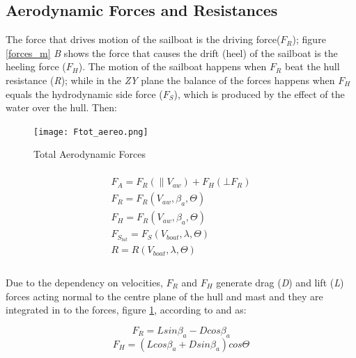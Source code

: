 \subsection{Aerodynamic Forces and Resistances} \label{sec:aero_forces}
The force that drives motion of the sailboat is the driving force($F_{R}$); figure \ref{forces_m} \textit{B}  shows the force that causes the drift (heel) of the sailboat is the heeling force ($F_{H}$). The motion of the sailboat happens when $F_{R}$ beat the hull resistance (\textit{R}); while in the \textit{ZY} plane the balance of the forces happens when $F_{H}$ equals the hydrodynamic side force ($F_{S}$), which is produced by the effect of the water over the hull. Then:\par 
\begin{figure}
    \centering
    \texttt{[image: Ftot\_aereo.png]}
    \caption{Total Aerodynamic Forces \cite{fossati2009aero}}
    \label{fig:Ftot_aereo}
\end{figure}
\begin{multline}
\\
F_{A}=F_{R}(\parallel V_{aw}) + F_{H}(\bot F_{R} )\\
F_{R}=F_{R}(V_{aw},\beta_{a}, \Theta) \\
F_{H}=F_{R}(V_{aw},\beta_{a}, \Theta) \\
F_{S_{lat}}=F_{S}(V_{boat},\lambda, \Theta) \\
R=R(V_{boat},\lambda, \Theta)\\  
\end{multline}
\\
Due to the dependency on velocities, $F_{R}$ and $F_{H}$ generate drag (\textit{D}) and lift (\textit{L}) forces acting normal to the centre plane of the hull and mast and they are integrated in to the forces, figure \ref{fig:Ftot_aereo}, according to \cite{philpott1993yacht} and \cite{claughton1998sailing} as: \par 
\begin{equation} \label{eq:Fr_LD}
    F_{R}=L sin \beta_{a} - D cos \beta_{a}
\end{equation}
\begin{equation} \label{eq:Fh_LD}
    F_{H}=(L cos \beta_{a} + D sin \beta_{a}) cos\Theta
\end{equation}
